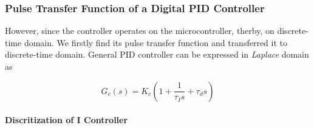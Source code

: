 \documentclass[a4paper,12pt]{article}
\begin{document}
\begin{enumerate}
	
	
	
	
	
	
	
	
	
	
	
	\subsubsection*{ Pulse Transfer Function of a Digital PID Controller }
	
	However, since the controller operates on the microcontroller, therby, on discrete-time domain. We firstly find its pulse transfer function and transferred it to discrete-time domain. General PID controller can be expressed in \textit{Laplace} domain as 
	
	
	$$ G_c(s)=K_c(1+\frac{1}{\tau_I s}+\tau_d s )$$  
	
	
	\paragraph*{ Discritization of I Controller }
	

\end{enumerate}
\end{document}

